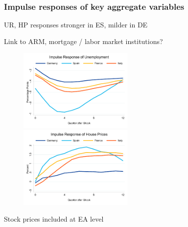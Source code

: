\documentclass[pdflatex,aspectratio=169]{beamer}
\begin{document}
\begin{frame}\frametitle{\bf Impulse responses of key aggregate variables}
\bi
\item UR, HP responses stronger in ES, milder in DE
\item Link to ARM, mortgage / labor market institutions?
\ei
\begin{figure}
\begin{center}
\includegraphics[width=0.5\textwidth]{./figures/irf_UR}
\includegraphics[width=0.5\textwidth]{./figures/irf_HP}
\end{center}
\end{figure}
\bi
\item Stock prices included at EA level
\ei
\end{frame}


\end{document}
